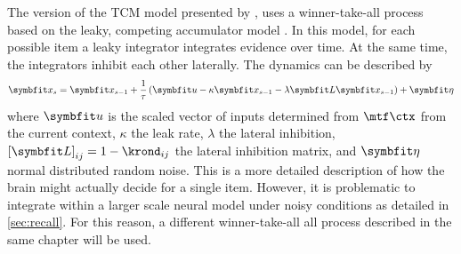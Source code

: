 The version of the TCM model presented by \textcite{Sederberg2008}, uses a winner-take-all process based on the leaky, competing accumulator model \parencite{Usher2001}.
In this model, for each possible item a leaky integrator integrates evidence over time.
At the same time, the integrators inhibit each other laterally.
The dynamics can be described by
\begin{equation}
    \vc x_s = \vc x_{s - 1} + \frac{1}{\tau} \del{\vc u - \kappa \vc x_{s - 1} - \lambda \mat L \vc x_{s - 1}} + \vc\eta
\end{equation}
where $\vc u$ is the scaled vector of inputs determined from $\mtf \ctx$ from the current context, $\kappa$ the leak rate, $\lambda$ the lateral inhibition, ${[\mat L]}_{ij} = 1 - \krond_{ij}$ the lateral inhibition matrix, and $\vc\eta$ normal distributed random noise.
This is a more detailed description of how the brain might actually decide for a single item.
However, it is problematic to integrate within a larger scale neural model under noisy conditions as detailed in \cref{sec:recall}.
For this reason, a different winner-take-all all process described in the same chapter will be used.
